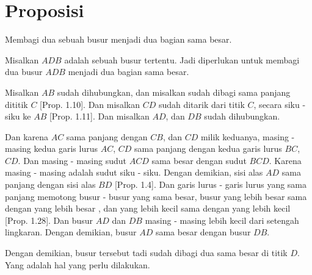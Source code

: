 \documentclass[a4paper]{book}
\begin{document}
\section*{\centering Proposisi \thesection}
Membagi dua sebuah busur menjadi dua bagian sama besar.

\begin{center}
\end{center}

Misalkan $ADB$ adalah sebuah busur tertentu. Jadi diperlukan untuk
membagi dua busur $ADB$ menjadi dua bagian sama besar.

Misalkan $AB$ sudah dihubungkan, dan misalkan sudah dibagi sama panjang
dititik $C$ [Prop. 1.10]. Dan misalkan $CD$ sudah ditarik dari titik $C$,
secara siku - siku ke $AB$ [Prop. 1.11]. Dan misalkan $AD$, dan $DB$ sudah
dihubungkan.

Dan karena $AC$ sama panjang dengan $CB$, dan $CD$ milik keduanya, 
masing - masing kedua garis lurus $AC$, $CD$ sama panjang dengan kedua garis
lurus $BC$, $CD$. Dan masing - masing sudut $ACD$ sama besar dengan sudut $BCD$. Karena masing - masing adalah sudut siku - siku. Dengan demikian, sisi alas 
$AD$ sama panjang dengan sisi alas $BD$ [Prop. 1.4]. Dan garis lurus - garis
lurus yang sama panjang memotong busur - busur yang sama besar, busur yang 
lebih besar sama dengan yang lebih besar , dan yang lebih kecil sama dengan yang
lebih kecil [Prop. 1.28]. Dan busur $AD$ dan $DB$ masing - masing lebih kecil
dari setengah lingkaran. Dengan demikian, busur $AD$ sama besar dengan busur
$DB$.

Dengan demikian, busur tersebut tadi sudah dibagi dua sama besar di titik $D$.
Yang adalah hal yang perlu dilakukan.

\end{document}
